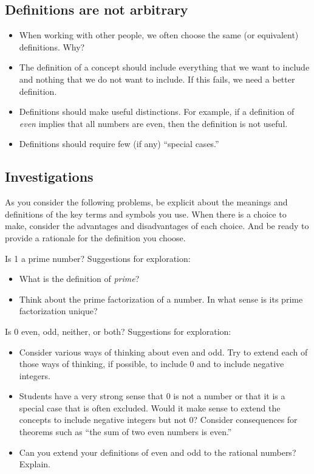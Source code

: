 \documentclass[space,nooutcomes]{ximera}
\begin{document}
\subsection*{Definitions are not arbitrary}
\begin{itemize}
\item When working with other people, we often choose the same (or equivalent) definitions.  Why?  
\item The definition of a concept should include everything that we want to include and nothing that we do not want to include.  If this fails, we need a better definition.  
\item Definitions should make useful distinctions.  For example, if a definition of \emph{even} implies that all numbers are even, then the definition is not useful.
\item Definitions should require few (if any) ``special cases.''  
\end{itemize}

\subsection*{Investigations}
As you consider the following problems, be explicit about the meanings and definitions of the key terms and symbols you use.  When there is a choice to make, consider the advantages and disadvantages of each choice.  And be ready to provide a rationale for the definition you choose.  

\begin{problem}
Is 1 a prime number?  Suggestions for exploration:  
\begin{itemize}
\item What is the definition of \emph{prime}?  
\item Think about the prime factorization of a number.  In what sense is its prime factorization unique?  
\end{itemize}
\end{problem}

\begin{problem}
Is 0 even, odd, neither, or both?  Suggestions for exploration:  
\begin{itemize}
\item Consider various ways of thinking about even and odd.  Try to extend each of those ways of thinking, if possible, to include 0 and to include negative integers.     
\item Students have a very strong sense that 0 is not a number or that it is a special case that is often excluded.  Would it make sense to extend the concepts to include negative integers but not 0?  Consider consequences for theorems such as ``the sum of two even numbers is even.''
\item Can you extend your definitions of even and odd to the rational numbers?  Explain.  
\end{itemize}
\end{problem}
\end{document}
